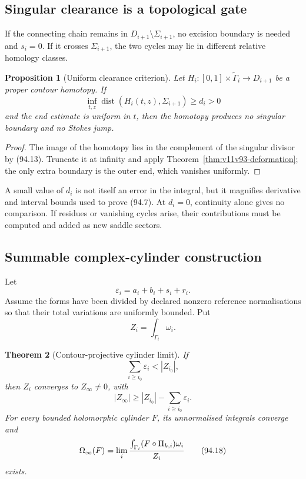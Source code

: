 \documentclass[11pt]{article}
\newtheorem{theorem}{Theorem}[section]
\newtheorem{proposition}[theorem]{Proposition}
\begin{document}
\subsection{Singular clearance is a topological gate}

If the connecting chain remains in
\(D_{i+1}\setminus\Sigma_{i+1}\), no excision boundary is needed and
\(s_i=0\).  If it crosses \(\Sigma_{i+1}\), the two cycles may lie in
different relative homology classes.

\begin{proposition}[Uniform clearance criterion]
\label{prop:v11v94-clearance}
Let \(H_i:[0,1]\times\widetilde\Gamma_i\to D_{i+1}\) be a proper
contour homotopy.  If
\[
 \inf_{t,z}\operatorname{dist}
       (H_i(t,z),\Sigma_{i+1})\ge d_i>0                     \tag{94.13}
\]
and the end estimate is uniform in \(t\), then the homotopy produces
no singular boundary and no Stokes jump.
\end{proposition}

\begin{proof}
The image of the homotopy lies in the complement of the singular
divisor by (94.13).  Truncate it at infinity and apply
Theorem~\ref{thm:v11v93-deformation}; the only extra boundary is the
outer end, which vanishes uniformly.
\end{proof}

A small value of \(d_i\) is not itself an error in the integral, but
it magnifies derivative and interval bounds used to prove (94.7).
At \(d_i=0\), continuity alone gives no comparison.  If residues or
vanishing cycles arise, their contributions must be computed and
added as new saddle sectors.

\subsection{Summable complex-cylinder construction}

Let
\[
                              \varepsilon_i=a_i+b_i+s_i+r_i. \tag{94.14}
\]
Assume the forms have been divided by declared nonzero reference
normalisations so that their total variations are uniformly bounded.
Put
\[
                              Z_i=\int_{\Gamma_i}\omega_i.    \tag{94.15}
\]

\begin{theorem}[Contour-projective cylinder limit]
\label{thm:v11v94-limit}
If
\[
                       \sum_{i\ge i_0}\varepsilon_i<|Z_{i_0}|,\tag{94.16}
\]
then \(Z_i\) converges to \(Z_\infty\ne0\), with
\[
 |Z_\infty|\ge|Z_{i_0}|-\sum_{i\ge i_0}\varepsilon_i.        \tag{94.17}
\]
For every bounded holomorphic cylinder \(F\), its unnormalised
integrals converge and
\[
 \Omega_\infty(F)
 =\lim_i
 {\int_{\Gamma_i}(F\circ\Pi_{k,i})\omega_i\over Z_i}         \tag{94.18}
\]
exists.
\end{theorem}
\end{document}
